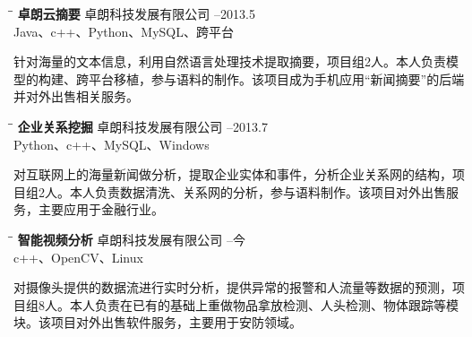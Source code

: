 \documentclass{res}
\begin{document}
\begin{CJK}{UTF8}{gbsn}
\begin{resume}
   \vspace{-0.1in}	
   \begin{tabbing}
   \hspace{2.3in}\= \hspace{2.6in}\= \kill %
    {\bf 卓朗云摘要} \>卓朗科技发展有限公司     --2013.5\\
                             \>Java、c++、Python、MySQL、跨平台
   \end{tabbing}\vspace{-20pt}      %
   针对海量的文本信息，利用自然语言处理技术提取摘要，项目组2人。本人负责模型的构建、跨平台移植，参与语料的制作。该项目成为手机应用“新闻摘要”的后端并对外出售相关服务。
   
   \vspace{-0.1in}	
   \begin{tabbing}
   \hspace{2.3in}\= \hspace{2.6in}\= \kill %
    {\bf 企业关系挖掘} \>卓朗科技发展有限公司     --2013.7\\
                             \>Python、c++、MySQL、Windows
   \end{tabbing}\vspace{-20pt}      %
   对互联网上的海量新闻做分析，提取企业实体和事件，分析企业关系网的结构，项目组2人。本人负责数据清洗、关系网的分析，参与语料制作。该项目对外出售服务，主要应用于金融行业。
   
   \vspace{-0.1in}	
   \begin{tabbing}
   \hspace{2.3in}\= \hspace{2.6in}\= \kill %
    {\bf 智能视频分析} \>卓朗科技发展有限公司     --今\\
                             \>c++、OpenCV、Linux
   \end{tabbing}\vspace{-20pt}      %
   对摄像头提供的数据流进行实时分析，提供异常的报警和人流量等数据的预测，项目组8人。本人负责在已有的基础上重做物品拿放检测、人头检测、物体跟踪等模块。该项目对外出售软件服务，主要用于安防领域。

\end{resume}
\end{CJK}
\end{document}
